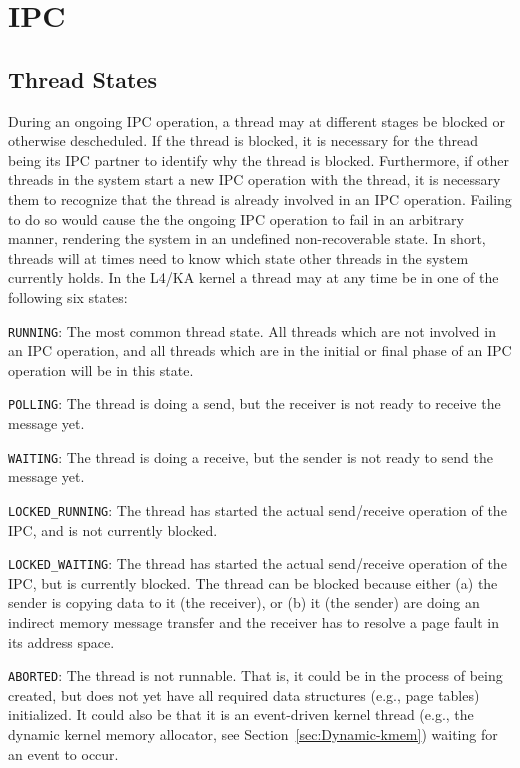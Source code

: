 \documentclass[a4paper,twoside]{book}
\newcommand{\state}[1]{\texttt{#1}}
\begin{document}
\section{IPC}

\subsection{Thread States}

During an ongoing IPC operation, a thread may at different stages be
blocked or otherwise descheduled.  If the thread is blocked, it is
necessary for the thread being its IPC partner to identify why the
thread is blocked.  Furthermore, if other threads in the system start
a new IPC operation with the thread, it is necessary them to recognize
that the thread is already involved in an IPC operation.  Failing to
do so would cause the the ongoing IPC operation to fail in an
arbitrary manner, rendering the system in an undefined non-recoverable
state.  In short, threads will at times need to know which state other
threads in the system currently holds.  In the L4/KA kernel a thread
may at any time be in one of the following six states:

\begin{description}
\item{\state{RUNNING}:} The most common thread state.  All threads
  which are not involved in an IPC operation, and all threads which
  are in the initial or final phase of an IPC operation will be in
  this state.

\item{\state{POLLING}:} The thread is doing a send, but the receiver
  is not ready to receive the message yet.

\item{\state{WAITING}:} The thread is doing a receive, but the sender
  is not ready to send the message yet.

\item{\state{LOCKED\_RUNNING}:} The thread has started the actual
  send/receive operation of the IPC, and is not currently blocked.

\item{\state{LOCKED\_WAITING}:} The thread has started the actual
  send/receive operation of the IPC, but is currently blocked.  The
  thread can be blocked because either (a) the sender is copying data
  to it (the receiver), or (b) it (the sender) are doing an indirect
  memory message transfer and the receiver has to resolve a page fault 
  in its address space.

\item{\state{ABORTED}:} The thread is not runnable.  That is, it could
  be in the process of being created, but does not yet have all
  required data structures (e.g., page tables) initialized.  It could
  also be that it is an event-driven kernel thread (e.g., the dynamic
  kernel memory allocator, see Section~\ref{sec:Dynamic-kmem}) waiting 
  for an event to occur.
\end{description}
\end{document}
